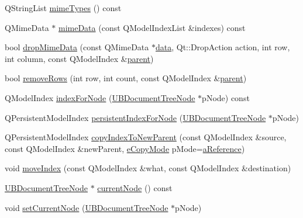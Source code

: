 \begin{DoxyCompactItemize}
\item 
Q\-String\-List \hyperlink{class_u_b_document_tree_model_aa0f802ccc6ae509c30e882e3fab985e1}{mime\-Types} () const 
\item 
Q\-Mime\-Data $\ast$ \hyperlink{class_u_b_document_tree_model_a35c439a8d39ac485825c233531009f27}{mime\-Data} (const Q\-Model\-Index\-List \&indexes) const 
\item 
bool \hyperlink{class_u_b_document_tree_model_af71ae3d84f577bbee154dea3eb0fad66}{drop\-Mime\-Data} (const Q\-Mime\-Data $\ast$\hyperlink{class_u_b_document_tree_model_a5be66c3a39b33101ddf1aaa4c90f0409}{data}, Qt\-::\-Drop\-Action action, int row, int column, const Q\-Model\-Index \&\hyperlink{class_u_b_document_tree_model_a6c75fc24b71d3a3d65e626f33ae02445}{parent})
\item 
bool \hyperlink{class_u_b_document_tree_model_ab3370874b72647577db9832e7748b894}{remove\-Rows} (int row, int count, const Q\-Model\-Index \&\hyperlink{class_u_b_document_tree_model_a6c75fc24b71d3a3d65e626f33ae02445}{parent})
\item 
Q\-Model\-Index \hyperlink{class_u_b_document_tree_model_a05779f6af8042fbe0c9f72002fb3f246}{index\-For\-Node} (\hyperlink{class_u_b_document_tree_node}{U\-B\-Document\-Tree\-Node} $\ast$p\-Node) const 
\item 
Q\-Persistent\-Model\-Index \hyperlink{class_u_b_document_tree_model_a920af1c0ab5249f14989bf30de776268}{persistent\-Index\-For\-Node} (\hyperlink{class_u_b_document_tree_node}{U\-B\-Document\-Tree\-Node} $\ast$p\-Node)
\item 
Q\-Persistent\-Model\-Index \hyperlink{class_u_b_document_tree_model_ade622c3d2ab31bbff2304db2bbbcf72a}{copy\-Index\-To\-New\-Parent} (const Q\-Model\-Index \&source, const Q\-Model\-Index \&new\-Parent, \hyperlink{class_u_b_document_tree_model_a8a3b8a397b5435e7f07bfa8de0061150}{e\-Copy\-Mode} p\-Mode=\hyperlink{class_u_b_document_tree_model_a8a3b8a397b5435e7f07bfa8de0061150acc3cab6ff862b626c218a67ad866bac1}{a\-Reference})
\item 
void \hyperlink{class_u_b_document_tree_model_a686c9c2ec9bc7b6e6c7dda982f86367e}{move\-Index} (const Q\-Model\-Index \&what, const Q\-Model\-Index \&destination)
\item 
\hyperlink{class_u_b_document_tree_node}{U\-B\-Document\-Tree\-Node} $\ast$ \hyperlink{class_u_b_document_tree_model_a16b4ce8c1564ded1bfa243fa7c5e0e5c}{current\-Node} () const 
\item 
void \hyperlink{class_u_b_document_tree_model_a2f39b7efdd09a0319e44c3430362d7fc}{set\-Current\-Node} (\hyperlink{class_u_b_document_tree_node}{U\-B\-Document\-Tree\-Node} $\ast$p\-Node)

\end{DoxyCompactItemize}

